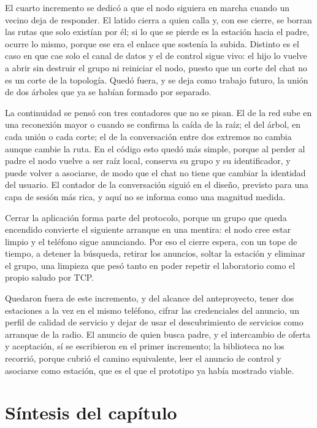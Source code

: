 \documentclass[12pt,oneside]{scrreprt}
\begin{document}
El cuarto incremento se dedicó a que el nodo siguiera en marcha cuando un vecino deja de responder. El latido cierra a quien calla y, con ese cierre, se borran las rutas que solo existían por él; si lo que se pierde es la estación hacia el padre, ocurre lo mismo, porque ese era el enlace que sostenía la subida. Distinto es el caso en que cae solo el canal de datos y el de control sigue vivo: el hijo lo vuelve a abrir sin destruir el grupo ni reiniciar el nodo, puesto que un corte del chat no es un corte de la topología. Quedó fuera, y se deja como trabajo futuro, la unión de dos árboles que ya se habían formado por separado.

La continuidad se pensó con tres contadores que no se pisan. El de la red sube en una reconexión mayor o cuando se confirma la caída de la raíz; el del árbol, en cada unión o cada corte; el de la conversación entre dos extremos no cambia aunque cambie la ruta. En el código esto quedó más simple, porque al perder al padre el nodo vuelve a ser raíz local, conserva su grupo y su identificador, y puede volver a asociarse, de modo que el chat no tiene que cambiar la identidad del usuario. El contador de la conversación siguió en el diseño, previsto para una capa de sesión más rica, y aquí no se informa como una magnitud medida.

Cerrar la aplicación forma parte del protocolo, porque un grupo que queda encendido convierte el siguiente arranque en una mentira: el nodo cree estar limpio y el teléfono sigue anunciando. Por eso el cierre espera, con un tope de tiempo, a detener la búsqueda, retirar los anuncios, soltar la estación y eliminar el grupo, una limpieza que pesó tanto en poder repetir el laboratorio como el propio saludo por TCP.

Quedaron fuera de este incremento, y del alcance del anteproyecto, tener dos estaciones a la vez en el mismo teléfono, cifrar las credenciales del anuncio, un perfil de calidad de servicio y dejar de usar el descubrimiento de servicios como arranque de la radio. El anuncio de quien busca padre, y el intercambio de oferta y aceptación, sí se escribieron en el primer incremento; la biblioteca no los recorrió, porque cubrió el camino equivalente, leer el anuncio de control y asociarse como estación, que es el que el prototipo ya había mostrado viable.

\section{Síntesis del capítulo}
\end{document}
